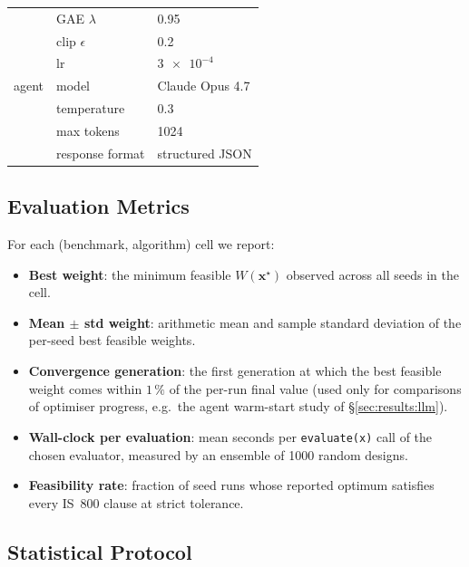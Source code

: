 \begin{table}[htbp]
\begin{tabular}{lll}
             & GAE $\lambda$                   & 0.95 \\
             & clip $\epsilon$                 & 0.2  \\
             & lr                              & $\num{3e-4}$ \\
    \midrule
    agent      & model                           & Claude Opus 4.7 \\
             & temperature                     & 0.3 \\
             & max tokens                      & 1024 \\
             & response format                 & structured JSON \\
    \bottomrule
  \end{tabular}
\end{table}

\subsection{Evaluation Metrics}
\label{sec:results:setup:metrics}

For each (benchmark, algorithm) cell we report:
\begin{itemize}
  \item \textbf{Best weight}: the minimum feasible
        $W(\mathbf{x}^\star)$ observed across all seeds in the cell.
  \item \textbf{Mean $\pm$ std weight}: arithmetic mean and
        sample standard deviation of the per-seed best feasible
        weights.
  \item \textbf{Convergence generation}: the first generation at
        which the best feasible weight comes within $\num{1}\,\%$
        of the per-run final value (used only for comparisons of
        optimiser progress, e.g.\ the agent warm-start study of
        \S\ref{sec:results:llm}).
  \item \textbf{Wall-clock per evaluation}: mean seconds per
        \texttt{evaluate(x)} call of the chosen evaluator,
        measured by an ensemble of 1000 random designs.
  \item \textbf{Feasibility rate}: fraction of seed runs whose
        reported optimum satisfies every IS~800 clause at
        strict tolerance.
\end{itemize}

\subsection{Statistical Protocol}
\label{sec:results:setup:stats}

